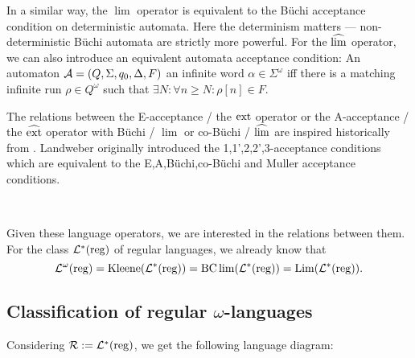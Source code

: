 In a similar way, the $\lim$ operator is equivalent to the Büchi acceptance condition on deterministic automata. Here the determinism matters --- non-deterministic Büchi automata are strictly more powerful. For the $\operatorname{\widehat{lim}}$ operator, we can also introduce an equivalent automata acceptance condition: An automaton $\mathcal{A} = (Q,\Sigma,q_0,\Delta,F)$  an infinite word $\alpha \in \Sigma^\omega$ iff there is a matching infinite run $\rho \in Q^\omega$ such that $\exists N \colon \forall n \ge N \colon \rho[n] \in F$.

The relations between the E-acceptance / the $\operatorname{ext}$ operator or the A-acceptance / the $\operatorname{\widehat{ext}}$ operator with Büchi / $\lim$ or co-Büchi / $\operatorname{\widehat{lim}}$ are inspired historically from \cite{Landweber69}. Landweber originally introduced the 1,1',2,2',3-acceptance conditions which are equivalent to the E,A,Büchi,co-Büchi and Muller acceptance conditions.

\

Given these language operators, we are interested in the relations between them. For the class $\mathcal{L}^*(\textup{\textrm{reg}})$ of regular languages, we already know that
\[ \mathcal{L}^\omega(\textup{\textrm{reg}}) = \operatorname{Kleene}(\mathcal{L}^*(\textup{\textrm{reg}})) = \operatorname{BC} \lim (\mathcal{L}^*(\textup{\textrm{reg}})) = \operatorname{Lim}(\mathcal{L}^*(\textup{\textrm{reg}})) . \]

\subsection{Classification of regular $\omega$-languages} %

\label{regomega-diagram}
Considering $\mathcal{R} := \mathcal{L}^*(\textup{\textrm{reg}})$, we get the following language diagram:


